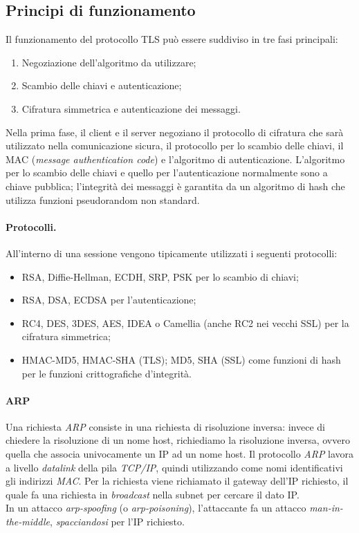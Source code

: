 \subsection{Principi di funzionamento}
Il funzionamento del protocollo TLS può essere suddiviso in tre fasi principali:
\begin{enumerate}
	\item Negoziazione dell'algoritmo da utilizzare;
	\item Scambio delle chiavi e autenticazione;
	\item Cifratura simmetrica e autenticazione dei messaggi.
\end{enumerate}
Nella prima fase, il client e il server negoziano il protocollo di cifratura che sarà utilizzato nella comunicazione sicura, il protocollo per lo scambio delle chiavi, il MAC (\textit{message authentication code}) e l'algoritmo di autenticazione. L'algoritmo per lo scambio delle chiavi e quello per l'autenticazione normalmente sono a chiave pubblica; l'integrità dei messaggi è garantita da un algoritmo di hash che utilizza funzioni pseudorandom non standard.

\paragraph{Protocolli.} All'interno di una sessione vengono tipicamente utilizzati i seguenti protocolli:
\begin{itemize}
	\item RSA, Diffie-Hellman, ECDH, SRP, PSK per lo scambio di chiavi;
	\item RSA, DSA, ECDSA per l'autenticazione;
	\item RC4, DES, 3DES, AES, IDEA o Camellia (anche RC2 nei vecchi SSL) per la cifratura simmetrica;
	\item HMAC-MD5, HMAC-SHA (TLS); MD5, SHA (SSL) come funzioni di hash per le funzioni crittografiche d'integrità. 
\end{itemize}

\paragraph{ARP}
Una richiesta \textit{ARP} consiste in una richiesta di risoluzione inversa: invece di chiedere la risoluzione di un nome host, richiediamo la risoluzione inversa, ovvero quella che associa univocamente un IP ad un nome host. Il protocollo \textit{ARP} lavora a livello \textit{datalink} della pila \textit{TCP/IP}, quindi utilizzando come nomi identificativi gli indirizzi \textit{MAC}. Per la richiesta viene richiamato il gateway dell'IP richiesto, il quale fa una richiesta in \textit{broadcast} nella subnet per cercare il dato IP. \\
In un attacco \textit{arp-spoofing} (o \textit{arp-poisoning}), l'attaccante fa un attacco \textit{man-in-the-middle}, \textit{spacciandosi} per l'IP richiesto.

